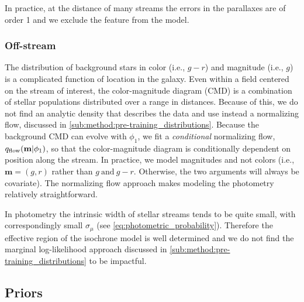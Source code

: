 \documentclass[twocolumn]{aastex631}
\begin{document}
            In practice, at the distance of many streams the errors in the
            parallaxes are of order 1 and we exclude the feature from the model.

    
        \subsubsection{Off-stream}
        \label{sub:method:photometric_model:off_stream}

            The distribution of background stars in color (i.e., $g-r$) and
            magnitude (i.e., $g$) is a complicated function of location in the
            galaxy. Even within a field centered on the
            stream of interest, the color-magnitude diagram (CMD) is a
            combination of stellar populations distributed over a range in
            distances. Because of this, we do not find an analytic density that
            describes the data and use instead a normalizing flow, discussed in
            \autoref{sub:method:pre-training_distributions}.  Because the
            background CMD can evolve with $\phi_1$, we fit a \emph{conditional}
            normalizing flow, $q_{\rm flow}(\mathbf{m}|\phi_1)$, so that the
            color-magnitude diagram is conditionally dependent on position along
            the stream. In practice, we model magnitudes and not colors (i.e.,
            $\mathbf{m} = (g,r)$ rather than $g \ \mathrm{and} \ g-r$.
            Otherwise, the two arguments will always be covariate). The
            normalizing flow approach makes modeling the photometry relatively
            straightforward.

            In photometry the intrinsic width of stellar streams tends to be
            quite small, with correspondingly small $\sigma_\mu$ (see
            \autoref{eq:photometric_probability}). Therefore the effective
            region of the isochrone model is well determined and we do not find
            the marginal log-likelihood approach discussed in
            \autoref{sub:method:pre-training_distributions} to be impactful.



    \subsection{Priors} \label{sub:methods:priors}
\end{document}
